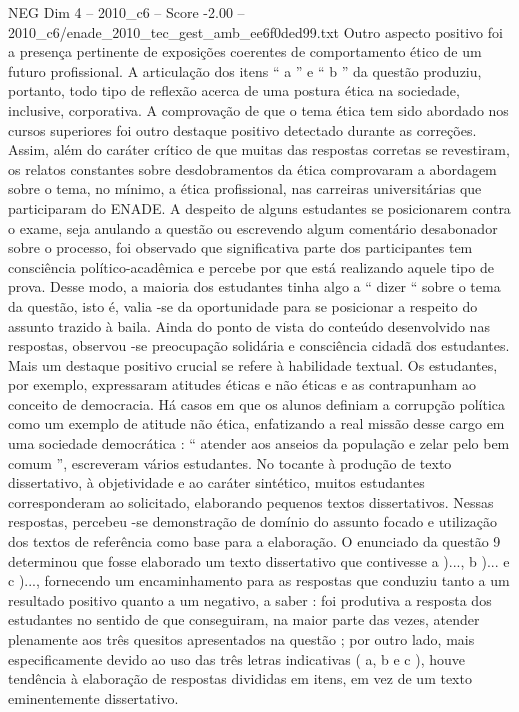 \begin{textsample}{NEG Dim 4 – 2010\_c6 – Score -2.00 – 2010\_c6/enade\_2010\_tec\_gest\_amb\_ee6f0ded99.txt}
Outro aspecto positivo foi a presença pertinente de exposições coerentes de comportamento ético de um futuro profissional.
A articulação dos itens “ a ” e “ b ” da questão produziu, portanto, todo tipo de reflexão acerca de uma postura ética na sociedade, inclusive, corporativa.
A comprovação de que o tema ética tem sido abordado nos cursos superiores foi outro destaque positivo detectado durante as correções.
Assim, além do caráter crítico de que muitas das respostas corretas se revestiram, os relatos constantes sobre desdobramentos da ética comprovaram a abordagem sobre o tema, no mínimo, a ética profissional, nas carreiras universitárias que participaram do ENADE.
A despeito de alguns estudantes se posicionarem contra o exame, seja anulando a questão ou escrevendo algum comentário desabonador sobre o processo, foi observado que significativa parte dos participantes tem consciência político-acadêmica e percebe por que está realizando aquele tipo de prova.
Desse modo, a maioria dos estudantes tinha algo a “ dizer “ sobre o tema da questão, isto é, valia -se da oportunidade para se posicionar a respeito do assunto trazido à baila.
Ainda do ponto de vista do conteúdo desenvolvido nas respostas, observou -se preocupação solidária e consciência cidadã dos estudantes.
Mais um destaque positivo crucial se refere à habilidade textual.
Os estudantes, por exemplo, expressaram atitudes éticas e não éticas e as contrapunham ao conceito de democracia.
Há casos em que os alunos definiam a corrupção política como um exemplo de atitude não ética, enfatizando a real missão desse cargo em uma sociedade democrática : “ atender aos anseios da população e zelar pelo bem comum ”, escreveram vários estudantes.
No tocante à produção de texto dissertativo, à objetividade e ao caráter sintético, muitos estudantes corresponderam ao solicitado, elaborando pequenos textos dissertativos.
Nessas respostas, percebeu -se demonstração de domínio do assunto focado e utilização dos textos de referência como base para a elaboração.
O enunciado da questão 9 determinou que fosse elaborado um texto dissertativo que contivesse a )..., b )... e c )..., fornecendo um encaminhamento para as respostas que conduziu tanto a um resultado positivo quanto a um negativo, a saber : foi produtiva a resposta dos estudantes no sentido de que conseguiram, na maior parte das vezes, atender plenamente aos três quesitos apresentados na questão ; por outro lado, mais especificamente devido ao uso das três letras indicativas ( a, b e c ), houve tendência à elaboração de respostas divididas em itens, em vez de um texto eminentemente dissertativo.

\end{textsample}
